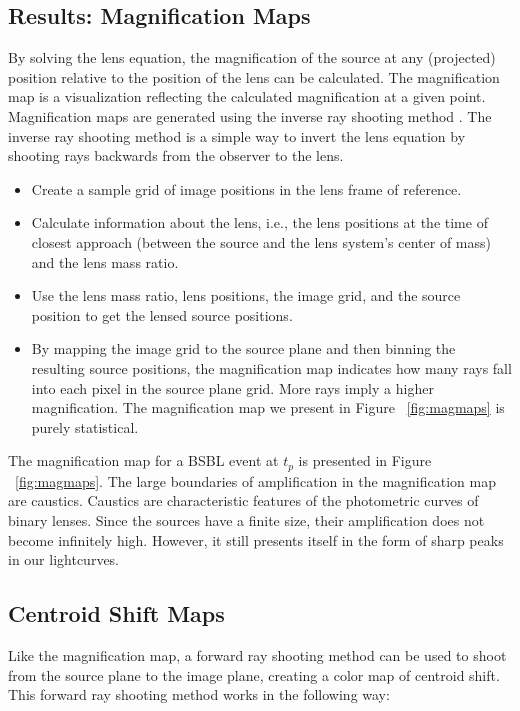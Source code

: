 \documentclass[twocolumn]{aastex701}
\begin{document}
\subsection{Results: Magnification Maps}
\label{sec:results_magmap}

By solving the lens equation, the magnification of the source at any (projected) position relative to the position of the lens can be calculated. The magnification map is a visualization reflecting the calculated magnification at a given point. Magnification maps are generated using the inverse ray shooting method \citep{Bennett_2010}. The inverse ray shooting method is a simple way to invert the lens equation by shooting
rays backwards from the observer to the lens.

\begin{itemize}
    \item Create a sample grid of image positions in the lens frame of reference. 
    \item Calculate information about the lens, i.e., the lens positions at the time of closest approach (between the source and the lens system’s center of mass) and the lens mass ratio.
    \item Use the lens mass ratio, lens positions, the image grid, and the source position to get the lensed source positions. 
    \item By mapping the image grid to the source plane and then binning the resulting source positions, the magnification map indicates how many rays fall into each pixel in the source plane grid. More rays imply a higher magnification. The magnification map we present in Figure ~\ref{fig:magmaps} is purely statistical. 
\end{itemize}

The magnification map for a BSBL event at $t_p$ is presented in Figure ~\ref{fig:magmaps}. The large boundaries of amplification in the magnification map are caustics. Caustics are characteristic features of the photometric curves of binary lenses. Since the sources have a finite size, their amplification does not become infinitely high. However, it still presents itself in the form of sharp peaks in our lightcurves. 

\subsection{Centroid Shift Maps}
\label{sec:results_asm}
Like the magnification map, a forward ray shooting method can be used to shoot from the source plane to the image plane, creating a color map of centroid shift. This forward ray shooting method works in the following way:
\end{document}
